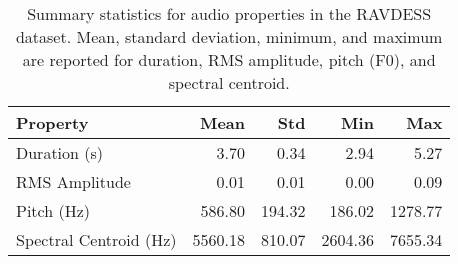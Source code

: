 \begin{table}[h]
\centering
\caption{Summary statistics for audio properties in the RAVDESS dataset. Mean, standard deviation, minimum, and maximum are reported for duration, RMS amplitude, pitch (F0), and spectral centroid.}
\begin{tabular}{lrrrr}
\hline
 Property               &    Mean &    Std &     Min &     Max \\
\hline
 Duration (s)           &    3.70 &   0.34 &    2.94 &    5.27 \\
 RMS Amplitude          &    0.01 &   0.01 &    0.00 &    0.09 \\
 Pitch (Hz)             &  586.80 & 194.32 &  186.02 & 1278.77 \\
 Spectral Centroid (Hz) & 5560.18 & 810.07 & 2604.36 & 7655.34 \\
\hline
\end{tabular}
\end{table}
